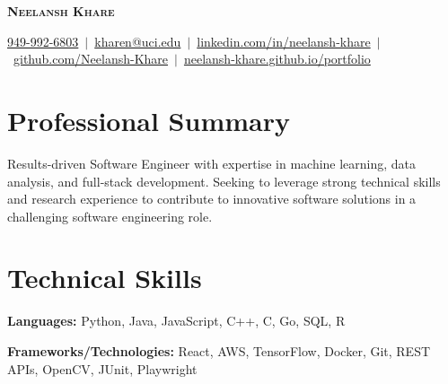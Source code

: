 \documentclass[letterpaper,11pt]{article}
\begin{document}
\begin{center}  
  \textbf{\Large \scshape Neelansh Khare} \\ \vspace{1pt}
  \color{blue}
  \begin{minipage}{1.05\textwidth}
  \centering
  \small \href{tel:19499926803}{{949-992-6803}}~$|$~\href{mailto:kharen@uci.edu}{{kharen@uci.edu}}~$|$~\href{https://linkedin.com/in/neelansh-khare}{{linkedin.com/in/neelansh-khare}}~$|$~\href{https://github.com/Neelansh-Khare}{{github.com/Neelansh-Khare}}~$|$~\href{https://neelansh-khare.github.io/portfolio/}{{neelansh-khare.github.io/portfolio}}
  \end{minipage}
\end{center}
\section{Professional Summary}
\begin{itemize}[leftmargin=0.15in, label={}, itemsep=0pt]
\small{\item{
  Results-driven Software Engineer with expertise in machine learning, data analysis, and full-stack development. Seeking to leverage strong technical skills and research experience to contribute to innovative software solutions in a challenging software engineering role.
}}
\end{itemize}

\section{Technical Skills}
\begin{itemize}[leftmargin=0.15in, label={}, itemsep=0pt]
\small{\item{
 \textbf{Languages:} Python, Java, JavaScript, C++, C, Go, SQL, R
}}
\small{\item{
 \textbf{Frameworks/Technologies:} React, AWS, TensorFlow, Docker, Git, REST APIs, OpenCV, JUnit, Playwright
}}
\end{itemize}

\end{document}
